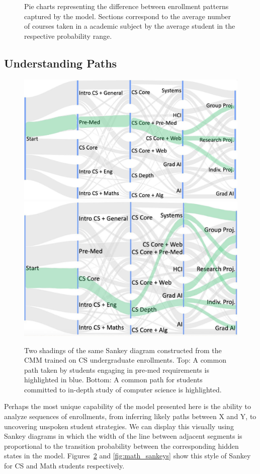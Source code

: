 \documentclass{edm_template}
\begin{document}
\begin{figure}[h]
    \caption{\label{fig:piecharts} Pie charts representing the difference between enrollment patterns captured by the model. Sections correspond to the average number of courses taken in a academic subject by the average student in the respective probability range.}
\end{figure}

\subsection{Understanding Paths}

   
\begin{figure}[h!]
    \centering
    \includegraphics[width=0.45\linewidth]{figures/premed_highlight.jpg} 
    \qquad
    \includegraphics[width=0.41\linewidth]{figures/systems_highlight.jpg}
    \caption{\label{fig:cs_sankeys} Two shadings of the same Sankey diagram constructed from the CMM trained on CS undergraduate enrollments. Top: A common path taken by students engaging in pre-med requirements is highlighted in blue. Bottom: A common path for students committed to in-depth study of computer science is highlighted.}
\end{figure}

Perhaps the most unique capability of the model presented here is the ability to analyze sequences of enrollments, from inferring likely paths between X and Y, to uncovering unspoken student strategies. We can display this visually using Sankey diagrams in which the width of the line between adjacent segments is proportional to the transition probability between the corresponding hidden states in the model. Figures~\ref{fig:cs_sankeys} and \ref{fig:math_sankeys} show this style of Sankey for CS and Math students respectively.
\end{document}
